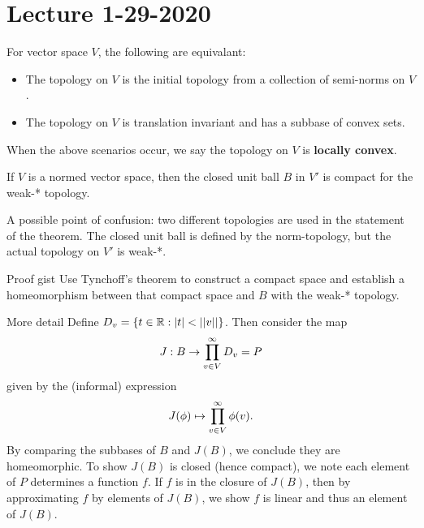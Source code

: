 \section{Lecture 1-29-2020}
For vector space $V$, the following are equivalant:
\begin{itemize}
    \item The topology on $V$ is the initial topology from a collection of semi-norms on $V$.

    \item The topology on $V$ is translation invariant and has a subbase of convex sets.
\end{itemize}
When the above scenarios occur, we say the topology on $V$ is \textbf{locally convex}.

\begin{thm}
    If $V$ is a normed vector space, then the closed unit ball $B$ in $V'$ is compact for the weak-* topology.
\end{thm}
\begin{remark}
    A possible point of confusion: two different topologies are used in the statement of the theorem. The closed unit ball is defined by the norm-topology, but the actual topology on $V'$ is weak-*.
\end{remark}
\begin{details}{Proof gist}
    Use Tynchoff's theorem to construct a compact space and establish a homeomorphism between that compact space and $B$ with the weak-* topology.
\end{details}
\begin{details}{More detail}
    Define $D_v = \{t \in {\mathbb R}: |t| < ||v|| \}$. Then consider the map
    \[
        J: B \rightarrow \prod^{\infty}_{v \in V}D_v = P
    \]
    given by the (informal) expression
    \[
        J(\phi) \mapsto \prod^{\infty}_{v \in V}\phi(v).
    \]
    By comparing the subbases of $B$ and $J(B)$, we conclude they are homeomorphic. To show $J(B)$ is closed (hence compact), we note each element of $P$ determines a function $f$. If $f$ is in the closure of $J(B)$, then by approximating $f$ by elements of $J(B)$, we show $f$ is linear and thus an element of $J(B)$. 
\end{details}

